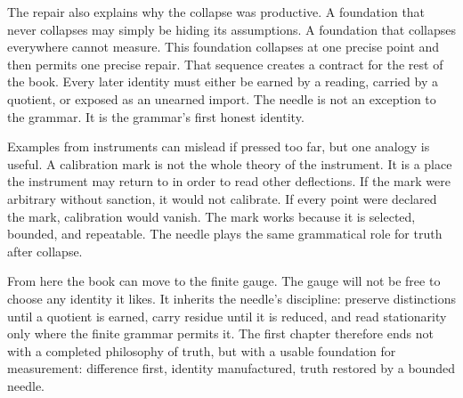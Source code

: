 The repair also explains why the collapse was productive. A foundation
that never collapses may simply be hiding its assumptions. A foundation
that collapses everywhere cannot measure. This foundation collapses at
one precise point and then permits one precise repair. That sequence
creates a contract for the rest of the book. Every later identity must
either be earned by a reading, carried by a quotient, or exposed as an
unearned import. The needle is not an exception to the grammar. It is
the grammar's first honest identity.

Examples from instruments can mislead if pressed too far, but one
analogy is useful. A calibration mark is not the whole theory of the
instrument. It is a place the instrument may return to in order to read
other deflections. If the mark were arbitrary without sanction, it would
not calibrate. If every point were declared the mark, calibration would
vanish. The mark works because it is selected, bounded, and repeatable.
The needle plays the same grammatical role for truth after collapse.

From here the book can move to the finite gauge. The gauge will not be
free to choose any identity it likes. It inherits the needle's
discipline: preserve distinctions until a quotient is earned, carry
residue until it is reduced, and read stationarity only where the
finite grammar permits it. The first chapter therefore ends not with a
completed philosophy of truth, but with a usable foundation for
measurement: difference first, identity manufactured, truth restored by
a bounded needle.
